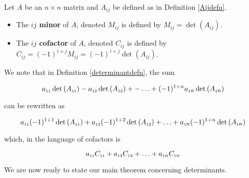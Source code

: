 \documentclass{ximera}
\begin{document}
\smallskip


\begin{definition}  \label{minorcofactordefn} Let $A$ be an $n \times n$ matrix and $A_{ij}$ be defined as in Definition \ref{Aijdefn}.  

\begin{itemize}

\item The   \textbf{\boldmath $ij$ minor} of $A$, denoted $M_{ij}$ is defined by $M_{ij} = \det\left(A_{ij}\right)$. 

\item The \textbf{\boldmath $ij$ cofactor} of $A$, denoted $C_{ij}$ is defined by $C_{ij} = (-1)^{i+j}M_{ij} = (-1)^{i+j}\det\left(A_{ij}\right)$. 

\end{itemize}

\end{definition}


\smallskip

We note that in Definition \ref{determinantdefn}, the sum 

\[a_{\mbox{\tiny$11$}} \det\left(A_{\mbox{\tiny$11$}}\right)- a_{\mbox{\tiny$12$}} \det\left(A_{\mbox{\tiny$12$}}\right) + -  \ldots  + (-1)^{1+n} a_{\mbox{\tiny$1$}n} \det\left(A_{\mbox{\tiny$1$}n}\right)\]

can be rewritten as

\[a_{\mbox{\tiny$11$}} (-1)^{1+1} \det\left(A_{\mbox{\tiny$11$}}\right) + a_{\mbox{\tiny$12$}} (-1)^{1+2} \det\left(A_{\mbox{\tiny$12$}}\right) + \ldots  + a_{\mbox{\tiny$1$}n} (-1)^{1+n} \det\left(A_{\mbox{\tiny$1$}n}\right)\]

which, in the language of cofactors is

\[a_{\mbox{\tiny$11$}} C_{\mbox{\tiny$11$}} + a_{\mbox{\tiny$12$}}C_{\mbox{\tiny$12$}} + \ldots  + a_{\mbox{\tiny$1$}n}C_{\mbox{\tiny$1$}n} \]

We are now ready to state our main theorem concerning determinants.

\smallskip

\end{document}
